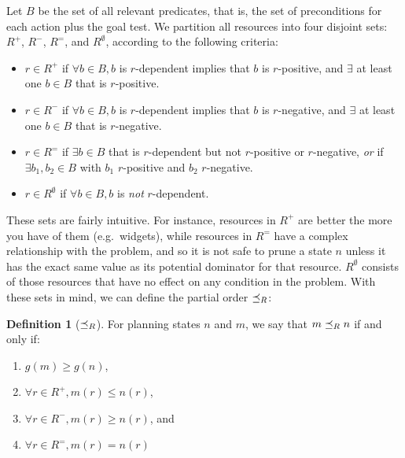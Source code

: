 \documentclass[letterpaper]{article}
\theoremstyle{plain} \newtheorem{theorem}{Theorem} \newtheorem{proposition}{Proposition} \newtheorem{lemma}{Lemma}
\theoremstyle{definition} \newtheorem{definition}{Definition} \newtheorem{conjecture}{Conjecture} \newtheorem*{example}{Example}
\theoremstyle{remark} \newtheorem*{remark}{Remark} \newtheorem*{note}{Note} \newtheorem{case}{Case}
\begin{document}
Let $B$ be the set of all relevant predicates, that is, the set of preconditions for each action plus the goal test. We partition all resources into four disjoint sets: $R^+$, $R^-$, $R^=$, and $R^\emptyset$, according to the following criteria:
\begin{itemize}
	\item $r \in R^+$ if $\forall b \in B, b$ is $r$-dependent implies that $b$ is $r$-positive, and $\exists$ at least one $b \in B$ that is $r$-positive.
	\item $r \in R^-$ if $\forall b \in B, b$ is $r$-dependent implies that $b$ is $r$-negative, and $\exists$ at least one $b \in B$ that is $r$-negative.
	\item $r \in R^=$ if $\exists b \in B$ that is $r$-dependent but not $r$-positive or $r$-negative, \emph{or} if $\exists b_1, b_2 \in B$ with $b_1$ $r$-positive and $b_2$ $r$-negative.
	\item $r \in R^\emptyset$ if $\forall b \in B, b$ is \emph{not} $r$-dependent.
\end{itemize}

These sets are fairly intuitive. For instance, resources in
$R^+$ are better the more you have of them (e.g.\ widgets),
while resources in $R^=$ have a complex relationship with
the problem, and so it is not safe to prune a state $n$ unless
it has the exact same value as its potential dominator for that
resource.  $R^\emptyset$ consists of those resources that
have no effect on any condition in the problem. With these sets
in mind, we can define the partial order $\preceq_R$:

\begin{definition}[$\preceq_R$]
	\label{def-po}
	For planning states $n$ and $m$, we say that $m \preceq_R n$ if and only if:
	\begin{enumerate}
		\item $g(m) \ge g(n)$,
		\item $\forall r \in R^+, m(r) \le n(r)$,
		\item $\forall r \in R^-, m(r) \ge n(r)$, and
		\item $\forall r \in R^=, m(r) = n(r)$
	\end{enumerate}
\end{definition}
\end{document}
